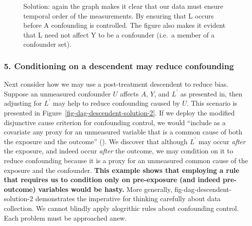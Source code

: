 \documentclass[
  singlecolumn,
  9pt]{article}
\begin{document}
\begin{figure}


\caption{\label{fig-dag-descendent-solution}Solution: again the graph
makes it clear that our data must ensure temporal order of the
measurements. By ensuring that L occurs before A confounding is
controlled. The figure also makes it evident that L need not affect Y to
be a confounder (i.e.~a member of a confounder set).}

\end{figure}%

\subsubsection{5. Conditioning on a descendent may reduce
confounding}\label{conditioning-on-a-descendent-may-reduce-confounding}

Next consider how we may use a post-treatment descendent to reduce bias.
Suppose an unmeasured confounder \(U\) affects \(A\), \(Y\), and
\(L^\prime\) as presented in, then adjusting for \(L^\prime\) may help
to reduce confounding caused by \(U\). This scenario is presented in
Figure~\ref{fig-dag-descendent-solution-2}. If we deploy the modified
disjunctive cause criterion for confounding control, we would ``include
as a covariate any proxy for an unmeasured variable that is a common
cause of both the exposure and the outcome''
(). We discover that
although \(L^\prime\) may occur \emph{after} the exposure, and indeed
occur \emph{after} the outcome, we may condition on it to reduce
confounding because it is a proxy for an unmeasured common cause of the
exposure and the confounder. \textbf{This example shows that employing a
rule that requires us to condition only on pre-exposure (and indeed
pre-outcome) variables would be hasty.} More generally,
fig-dag-descendent-solution-2 demonstrates the imperative for thinking
carefully about data collection. We cannot blindly apply alogrithic
rules about confounding control. Each problem must be approached anew.
\end{document}
